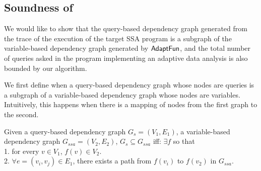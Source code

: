 %
%
\subsection{ Soundness of {\THESYSTEM}}
We would like to show that the query-based dependency graph generated from the trace of the execution of the target SSA program is a subgraph of the variable-based dependency graph generated by ${\textsf{AdaptFun}}$, and the total number of queries asked in the program implementing an adaptive data analysis is also bounded by our algorithm.

We first define when a query-based dependency graph whose nodes are queries is a subgraph of a variable-based dependency graph whose nodes are variables. Intuitively, this happens when there is a mapping of nodes from the first graph to the second.
\begin{defn}
[Subgraph]
Given a query-based dependency graph $G_{s} = (V_1, E_1)$, a variable-based dependency graph $G_{ssa} = (V_2, E_2)$, $G_{s} \subseteq G_{ssa}$ iff:
$\exists f$ so that \\
1. for every $v \in V_1$, $f(v) \in V_2$. 
\\
2. $\forall e=(v_i, v_j) \in E_1$, there exists a path 
from $f(v_i)$ to $f(v_2)$ in $G_{ssa}$.
\end{defn}

